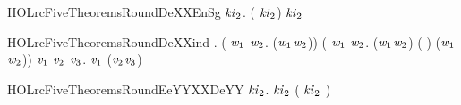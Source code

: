 \newcommand{\HOLrcFiveTheoremsRoundDeXXdef}{\UseVerbatim{HOLrcFiveTheoremsRoundDeXXdef}}
\begin{SaveVerbatim}{HOLrcFiveTheoremsRoundDeXXEnSg}
\HOLTokenTurnstile{} \HOLSymConst{\HOLTokenForall{}}  \ensuremath{\HOLBoundVar{ki}\sb{\mathrm{2}}}.  (   \ensuremath{\HOLBoundVar{ki}\sb{\mathrm{2}}})  \ensuremath{\HOLBoundVar{ki}\sb{\mathrm{2}}} \HOLSymConst{=} 
\end{SaveVerbatim}
\newcommand{\HOLrcFiveTheoremsRoundDeXXEnSg}{\UseVerbatim{HOLrcFiveTheoremsRoundDeXXEnSg}}
\begin{SaveVerbatim}{HOLrcFiveTheoremsRoundDeXXind}
\HOLTokenTurnstile{} \HOLSymConst{\HOLTokenForall{}}. (\HOLSymConst{\HOLTokenForall{}} \ensuremath{\HOLBoundVar{w}\sb{\mathrm{1}}} \ensuremath{\HOLBoundVar{w}\sb{\mathrm{2}}}.    (\ensuremath{\HOLBoundVar{w}\sb{\mathrm{1}}}\HOLSymConst{,}\ensuremath{\HOLBoundVar{w}\sb{\mathrm{2}}})) \HOLSymConst{\HOLTokenConj{}}
       (\HOLSymConst{\HOLTokenForall{}}  \ensuremath{\HOLBoundVar{w}\sb{\mathrm{1}}} \ensuremath{\HOLBoundVar{w}\sb{\mathrm{2}}}.    (\ensuremath{\HOLBoundVar{w}\sb{\mathrm{1}}}\HOLSymConst{,}\ensuremath{\HOLBoundVar{w}\sb{\mathrm{2}}}) \HOLSymConst{\HOLTokenImp{}}  ( )  (\ensuremath{\HOLBoundVar{w}\sb{\mathrm{1}}}\HOLSymConst{,}\ensuremath{\HOLBoundVar{w}\sb{\mathrm{2}}})) \HOLSymConst{\HOLTokenImp{}}
       \HOLSymConst{\HOLTokenForall{}} \ensuremath{\HOLBoundVar{v}\sb{\mathrm{1}}} \ensuremath{\HOLBoundVar{v}\sb{\mathrm{2}}} \ensuremath{\HOLBoundVar{v}\sb{\mathrm{3}}}.   \ensuremath{\HOLBoundVar{v}\sb{\mathrm{1}}} (\ensuremath{\HOLBoundVar{v}\sb{\mathrm{2}}}\HOLSymConst{,}\ensuremath{\HOLBoundVar{v}\sb{\mathrm{3}}})
\end{SaveVerbatim}
\newcommand{\HOLrcFiveTheoremsRoundDeXXind}{\UseVerbatim{HOLrcFiveTheoremsRoundDeXXind}}
\begin{SaveVerbatim}{HOLrcFiveTheoremsRoundEeYYXXDeYY}
\HOLTokenTurnstile{} \HOLSymConst{\HOLTokenForall{}}   \ensuremath{\HOLBoundVar{ki}\sb{\mathrm{2}}}.    \ensuremath{\HOLBoundVar{ki}\sb{\mathrm{2}}} (   \ensuremath{\HOLBoundVar{ki}\sb{\mathrm{2}}} ) \HOLSymConst{=} 
\end{SaveVerbatim}
